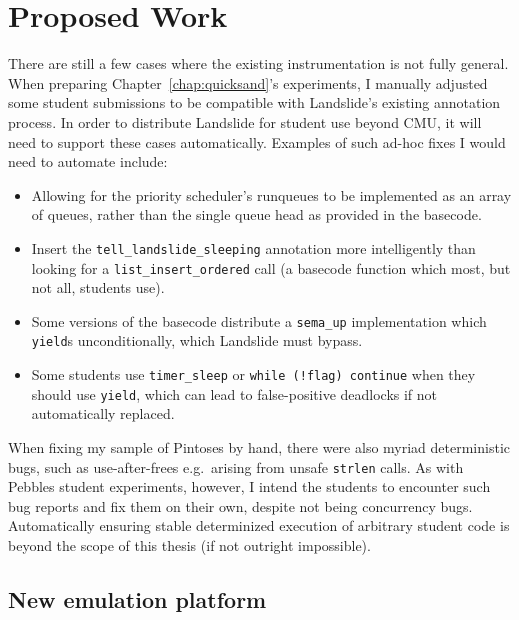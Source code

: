 \section{Proposed Work}

There are still a few cases where the existing instrumentation is not fully general.
When preparing Chapter~\ref{chap:quicksand}'s experiments, I manually adjusted some student submissions to be compatible with Landslide's existing annotation process.
In order to distribute Landslide for student use beyond CMU, it will need to support these cases automatically.
Examples of such ad-hoc fixes I would need to automate include:
\begin{itemize}
	\item Allowing for the priority scheduler's runqueues to be implemented as an array of queues, rather than the single queue head as provided in the basecode.
	\item Insert the {\tt tell\_landslide\_sleeping} annotation more intelligently than looking for a {\tt list\_insert\_ordered} call (a basecode function which most, but not all, students use).
	\item Some versions of the basecode distribute a {\tt sema\_up} implementation which {\tt yield}s unconditionally, which Landslide must bypass.
	\item Some students use {\tt timer\_sleep} or {\tt while (!flag) continue} when they should use {\tt yield}, which can lead to false-positive deadlocks if not automatically replaced.
\end{itemize}
When fixing my sample of Pintoses by hand, there were also myriad deterministic bugs, such as use-after-frees e.g.~arising from unsafe {\tt strlen} calls.
As with Pebbles student experiments, however, I intend the students to encounter such bug reports and fix them on their own, despite not being concurrency bugs.
Automatically ensuring stable determinized execution of arbitrary student code is beyond the scope of this thesis (if not outright impossible).

\subsection{New emulation platform}

